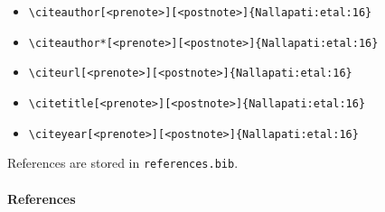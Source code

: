 \documentclass[
12pt,a4paper
]{article}
\begin{document}
\begin{itemize}
\item \verb=\citeauthor[<prenote>][<postnote>]{Nallapati:etal:16}= \newline \citeauthor[<prenote>][<postnote>]{Nallapati:etal:16}
\item \verb=\citeauthor*[<prenote>][<postnote>]{Nallapati:etal:16}= \newline \citeauthor*[<prenote>][<postnote>]{Nallapati:etal:16}
\item \verb=\citeurl[<prenote>][<postnote>]{Nallapati:etal:16}= \newline {}
\item \verb=\citetitle[<prenote>][<postnote>]{Nallapati:etal:16}= \newline {}
\item \verb=\citeyear[<prenote>][<postnote>]{Nallapati:etal:16}= \newline \citeyear[<prenote>][<postnote>]{Nallapati:etal:16}
\end{itemize} 

References are stored in \texttt{references.bib}.

\paragraph{References}
{\tiny
\printbibliography[heading=none]
}
\end{document}
